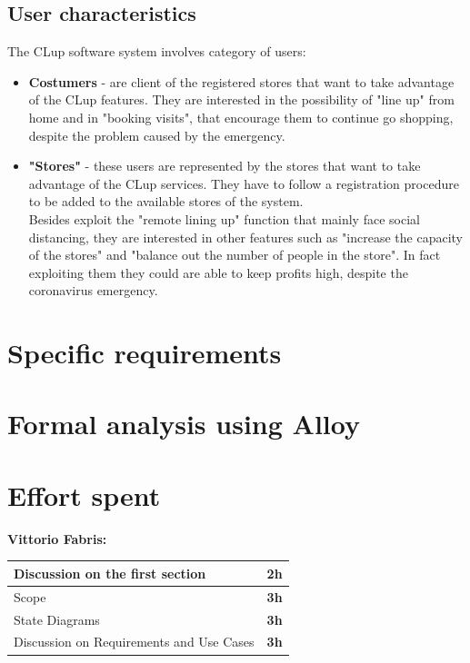 \documentclass[]{article}
\begin{document}
\subsection{User characteristics}
The CLup software system involves category of users:
\begin{itemize}
	\renewcommand{\labelitemi}{$-$}
	\item \textbf{Costumers} - are client of the registered stores that want to take advantage of the CLup features. They are interested in the possibility of "line up" from home and in "booking visits", that encourage them to continue go shopping, despite the problem caused by the emergency.
	
	\item \textbf{"Stores"} - these users are represented by the stores that want to take advantage of the CLup services. They have to follow a registration procedure to be added to the available stores of the system. 
	\\Besides exploit the "remote lining up" function that mainly face social distancing, they are interested in other features such as "increase the capacity of the stores" and "balance out the number of people in the store". In fact exploiting them they could are able to keep profits high, despite the coronavirus emergency. 		
\end{itemize}


	
	\section{Specific requirements}
	\section{Formal analysis using Alloy}
	
	\newpage
	
	\section{Effort spent}

	\textbf{\large Vittorio Fabris:} \\ \newline
		\begin{tabular}{|l|c|}
			\hline
			Discussion on the first section &  \textbf{2h} \\ \hline
			\rowcolor[HTML]{DCDCDC} 
			Scope & \textbf{3h} \\ \hline
			State Diagrams & \textbf{3h} \\ \hline
			Discussion on Requirements and Use Cases & \textbf{3h} \\ \hline
		\end{tabular}
		
\end{document}
